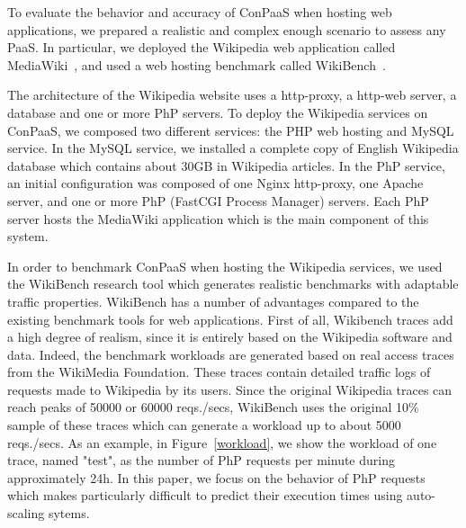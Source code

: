 To evaluate the behavior and accuracy of ConPaaS when hosting web applications, we prepared a realistic and complex enough scenario to assess any PaaS. In particular, we deployed the Wikipedia web application called MediaWiki~\cite{mediawiki}, and used a web hosting benchmark called WikiBench~\cite{wikibench}. 


The architecture of the Wikipedia website uses a http-proxy, a http-web server, a database and one or more PhP servers. To deploy the Wikipedia services on ConPaaS, we composed two different services: the PHP web hosting and MySQL service. In the MySQL service, we installed a complete copy of English Wikipedia database which contains about 30GB in Wikipedia articles. In the PhP service, an initial configuration was composed of one Nginx http-proxy, one Apache server, and one or more PhP (FastCGI Process Manager) servers. Each PhP server hosts the MediaWiki application which is the main component of this system. 

In order to benchmark ConPaaS when hosting the Wikipedia services, we used the WikiBench research tool which generates realistic benchmarks with adaptable traffic properties. WikiBench has a number of advantages compared to the existing benchmark tools for web applications. First of all, Wikibench traces add a high degree of realism, since it is entirely based on the Wikipedia software and data. Indeed, the benchmark workloads are generated based on real access traces from the WikiMedia Foundation. These traces contain detailed  traffic logs of requests made to Wikipedia by its users. Since the original Wikipedia traces can reach peaks of 50000 or 60000 reqs./secs, WikiBench uses the original 10\% sample of these traces which can generate a workload up to about 5000 reqs./secs. As an example, in Figure~\ref{workload}, we show the workload of one trace, named "test", as the number of PhP requests per minute during approximately 24h.  In this paper, we focus on the behavior of PhP requests which makes particularly difficult to predict their execution times using auto-scaling sytems. 


